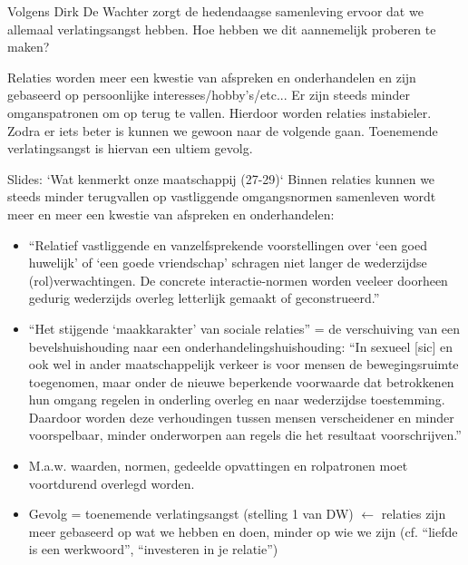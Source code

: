 \documentclass[main.tex]{subfiles}
\begin{document}
\begin{examenvraag}
    \begin{vraag}
        Volgens Dirk De Wachter zorgt de hedendaagse samenleving ervoor dat we allemaal verlatingsangst hebben. Hoe hebben we dit aannemelijk proberen te maken?
    \end{vraag}

    \begin{antwoord}
        Relaties worden meer een kwestie van afspreken en onderhandelen en zijn gebaseerd op persoonlijke interesses/hobby's/etc...
        Er zijn steeds minder omganspatronen om op terug te vallen.
        Hierdoor worden relaties instabieler.
        Zodra er iets beter is kunnen we gewoon naar de volgende gaan.
        Toenemende verlatingsangst is hiervan een ultiem gevolg.
        \begin{citaat}{Slides: `Wat kenmerkt onze maatschappij (27-29)`}
            Binnen relaties kunnen we steeds minder terugvallen op vastliggende omgangsnormen samenleven wordt meer en meer een kwestie van afspreken en onderhandelen:
            \begin{itemize}
                \item ``Relatief vastliggende en vanzelfsprekende voorstellingen over `een goed huwelijk' of `een goede vriendschap' schragen niet langer de wederzijdse (rol)verwachtingen.
                    De concrete interactie-normen worden veeleer doorheen gedurig wederzijds overleg letterlijk gemaakt of geconstrueerd.''
                \item ``Het stijgende ‘maakkarakter’ van sociale relaties'' = de verschuiving van een bevelshuishouding naar een onderhandelingshuishouding:
                    ``In sexueel [sic] en ook wel in ander maatschappelijk verkeer is voor mensen de bewegingsruimte toegenomen, maar onder de nieuwe beperkende voorwaarde dat betrokkenen hun omgang regelen in onderling overleg en naar wederzijdse toestemming.
                    Daardoor worden deze verhoudingen tussen mensen verscheidener en minder voorspelbaar, minder onderworpen aan regels die het resultaat voorschrijven.''
                \item M.a.w. waarden, normen, gedeelde opvattingen en rolpatronen moet voortdurend overlegd worden.
                \item Gevolg = toenemende verlatingsangst (stelling 1 van DW) $\leftarrow$ relaties zijn meer gebaseerd op wat we hebben en doen, minder op wie we zijn (cf. ``liefde is een werkwoord'', ``investeren in je relatie'')
            \end{itemize}
        \end{citaat}
    \end{antwoord}
\end{examenvraag}
\end{document}

